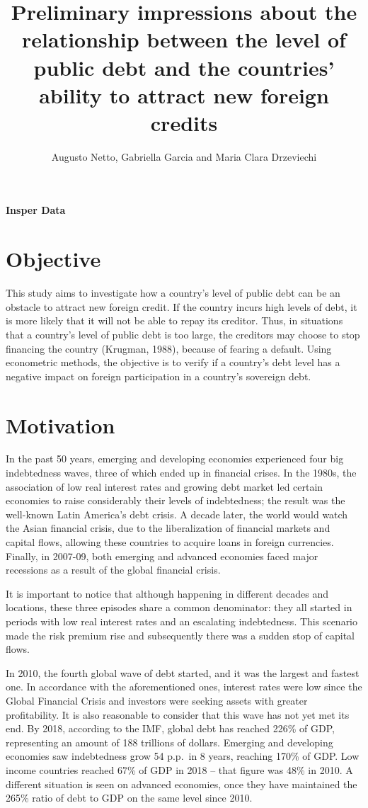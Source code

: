 \documentclass[]{article}
\title{Preliminary impressions about the relationship between the level of
public debt and the countries' ability to attract new foreign credits}
\author{Augusto Netto, Gabriella Garcia and Maria Clara Drzeviechi}
\date{}
\begin{document}
\maketitle

{
\setcounter{tocdepth}{2}
\tableofcontents
}
\textbf{Insper Data}

\section{Objective}\label{objective}

This study aims to investigate how a country's level of public debt can
be an obstacle to attract new foreign credit. If the country incurs high
levels of debt, it is more likely that it will not be able to repay its
creditor. Thus, in situations that a country's level of public debt is
too large, the creditors may choose to stop financing the country
(Krugman, 1988), because of fearing a default. Using econometric
methods, the objective is to verify if a country's debt level has a
negative impact on foreign participation in a country's sovereign debt.

\section{Motivation}\label{motivation}

In the past 50 years, emerging and developing economies experienced four
big indebtedness waves, three of which ended up in financial crises. In
the 1980s, the association of low real interest rates and growing debt
market led certain economies to raise considerably their levels of
indebtedness; the result was the well-known Latin America's debt crisis.
A decade later, the world would watch the Asian financial crisis, due to
the liberalization of financial markets and capital flows, allowing
these countries to acquire loans in foreign currencies. Finally, in
2007-09, both emerging and advanced economies faced major recessions as
a result of the global financial crisis.

It is important to notice that although happening in different decades
and locations, these three episodes share a common denominator: they all
started in periods with low real interest rates and an escalating
indebtedness. This scenario made the risk premium rise and subsequently
there was a sudden stop of capital flows.

In 2010, the fourth global wave of debt started, and it was the largest
and fastest one. In accordance with the aforementioned ones, interest
rates were low since the Global Financial Crisis and investors were
seeking assets with greater profitability. It is also reasonable to
consider that this wave has not yet met its end. By 2018, according to
the IMF, global debt has reached 226\% of GDP, representing an amount of
188 trillions of dollars. Emerging and developing economies saw
indebtedness grow 54 p.p.~in 8 years, reaching 170\% of GDP. Low income
countries reached 67\% of GDP in 2018 -- that figure was 48\% in 2010. A
different situation is seen on advanced economies, once they have
maintained the 265\% ratio of debt to GDP on the same level since 2010.
\end{document}
